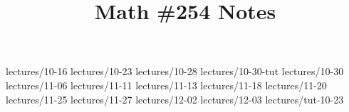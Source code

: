 \documentclass{scrartcl}
\title{Math \#254 Notes}
\begin{document}
\maketitle

\clearpage
\tableofcontents



{lectures/10-16}
{lectures/10-23}
{lectures/10-28}
{lectures/10-30-tut}
{lectures/10-30}
{lectures/11-06}
{lectures/11-11}
{lectures/11-13}
{lectures/11-18}
{lectures/11-20}
{lectures/11-25}
{lectures/11-27}
{lectures/12-02}
{lectures/12-03}
{lectures/tut-10-23}
\end{document}
